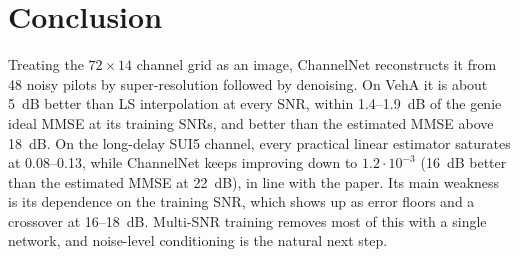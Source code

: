 \documentclass[10pt,a4paper]{article}
\begin{document}
\section{Conclusion}

Treating the $72\times14$ channel grid as an image, ChannelNet reconstructs it from 48 noisy pilots by
super-resolution followed by denoising. On VehA it is about 5~dB better than LS interpolation at every
SNR, within 1.4--1.9~dB of the genie ideal MMSE at its training SNRs, and better than the estimated
MMSE above 18~dB. On the long-delay SUI5 channel, every practical linear estimator saturates at
0.08--0.13, while ChannelNet keeps improving down to $1.2\cdot10^{-3}$ (16~dB better than the
estimated MMSE at 22~dB), in line with the paper. Its main weakness is its dependence on the training
SNR, which shows up as error floors and a crossover at 16--18~dB. Multi-SNR training removes most of
this with a single network, and noise-level conditioning is the natural next step.
\end{document}
